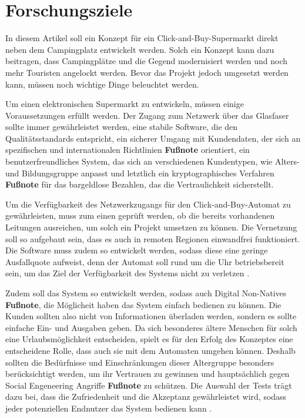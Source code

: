 \section{Forschungsziele}


In diesem Artikel soll ein Konzept für ein Click-and-Buy-Supermarkt direkt neben dem Campingplatz 
entwickelt werden. Solch ein Konzept kann dazu beitragen, dass Campingplätze und die Gegend
modernisiert werden und noch mehr Touristen angelockt werden. Bevor das Projekt jedoch umgesetzt 
werden kann, müssen noch wichtige Dinge beleuchtet werden. 


Um einen elektronischen Supermarkt zu entwickeln, müssen einige Voraussetzungen erfüllt werden.
Der Zugang zum Netzwerk über das Glasfaser sollte immer gewährleistet werden, eine stabile 
Software, die den Qualitätsstandards entspricht, ein sicherer Umgang mit Kundendaten, der sich an 
spezifischen und internationalen Richtlinien \textbf{Fußnote} orientiert, ein benutzerfreundliches System, das sich an 
verschiedenen Kundentypen, wie Alters- und Bildungsgruppe anpasst und letztlich ein kryptographisches
Verfahren \textbf{Fußnote} für das bargeldlose Bezahlen, das die Vertraulichkeit sicherstellt.


Um die Verfügbarkeit des Netzwerkzugangs für den Click-and-Buy-Automat zu gewährleisten, muss zum einen 
geprüft werden, ob die bereits vorhandenen Leitungen ausreichen, um solch ein Projekt umsetzen zu können.
Die Vernetzung soll so aufgebaut sein, dass es auch in remoten Regionen einwandfrei funktioniert. 
Die Software muss zudem so entwickelt werden, sodass diese eine geringe Ausfallquote aufweist, 
denn der Automat soll rund um die Uhr betriebsbereit sein, um das Ziel der Verfügbarkeit des
 Systems nicht zu verletzen \cite{refbook:SWIS}.


Zudem soll das System so entwickelt werden, sodass auch Digital Non-Natives \textbf{Fußnote}, die Möglicheit
\cite{refart:QWDN} haben das System einfach bedienen zu können. Die Kunden sollten also nicht von 
Informationen überladen werden, sondern es sollte einfache Ein- und Ausgaben geben. Da sich besonderes
ältere Menschen für solch eine Urlaubsmöglichkeit entscheiden, spielt es für den Erfolg des Konzeptes 
eine entscheidene Rolle, dass auch sie mit dem Automaten umgehen können. Deshalb sollten die Bedürfnisse
und Einschränkungen dieser Altergruppe besonders berücksichtigt werden, um ihr Vertrauen zu gewinnen
\cite{refart:HLAU} und hauptsächlich gegen Social Engeneering Angriffe \textbf{Fußnote} zu schützen. Die Auswahl der
Tests trägt dazu bei, dass die Zufriedenheit und die Akzeptanz gewährleistet wird, sodass jeder 
potenziellen Endnutzer das System bedienen kann \cite{refbook:IASE}.

